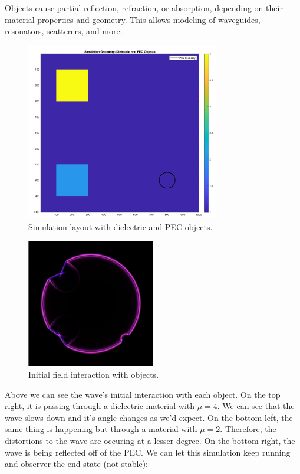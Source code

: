 \documentclass[12pt]{article}
\begin{document}
\begin{spacing}{1.5}
Objects cause partial reflection, refraction, or absorption, depending on their material properties and geometry. This allows modeling of waveguides, resonators, scatterers, and more.

\begin{figure}[h!]
    \centering
    \includegraphics[width=0.75\textwidth]{sim_geom}
    \caption{Simulation layout with dielectric and PEC objects.}
    \label{fig:sim_geom}
\end{figure}

\begin{figure}[h!]
    \centering
    \includegraphics[width=0.5\textwidth]{sim2}
    \caption{Initial field interaction with objects.}
    \label{fig:sim2}
\end{figure}

\FloatBarrier

Above we can see the wave's initial interaction with each object. On the top right, it is passing through a dielectric material with $\mu = 4$. We can see that the wave slows down and it's angle changes as we'd expect. On the bottom left, the same thing is happening but through a material with $\mu = 2$. Therefore, the distortions to the wave are occuring at a lesser degree. On the bottom right, the wave is being reflected off of the PEC. We can let this simulation keep running and observer the end state (not stable):


\end{spacing}
\end{document}
